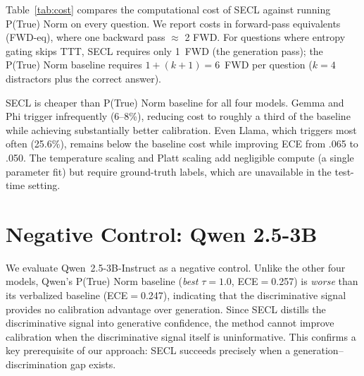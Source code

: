 Table~\ref{tab:cost} compares the computational cost of SECL against
running P(True) Norm on every question.
We report costs in forward-pass equivalents (FWD-eq), where one 
backward pass $\approx$ 2 FWD.
For questions where entropy gating skips TTT, SECL requires only 1~FWD 
(the generation pass); the P(True) Norm baseline requires $1 + (k{+}1) = 6$~FWD 
per question ($k{=}4$ distractors plus the correct answer).

\begin{table}[htbp]
\centering
\small
{}%
\caption{Computational cost comparison (in FWD-equivalents).
\emph{Trained} = questions receiving TTT;
\emph{Skipped} = entropy-gated questions (generation only).
Per trained question: ${\approx}15$ FWD-eq 
(1~gen $+$ 5~P(True) $+$ 3~epochs $\times$ 3~FWD-eq/step).
Per skipped question: $1$ FWD-eq.
P(True) Norm baseline: 6 FWD-eq $\times$ 2{,}000 $= 12{,}000$.}
\label{tab:cost}
\vspace{-0.5em}
\end{table}

SECL is cheaper than P(True) Norm baseline for all four models.
Gemma and Phi trigger infrequently (6--8\%), reducing cost to roughly
a third of the baseline while achieving substantially better calibration.
Even Llama, which triggers most often (25.6\%), remains below the
baseline cost while improving ECE from .065 to .050.
The temperature scaling and Platt scaling add negligible compute
(a single parameter fit) but require ground-truth labels, which are 
unavailable in the test-time setting.

\section{Negative Control: Qwen 2.5-3B} \label{app:qwen}

We evaluate Qwen~2.5-3B-Instruct \citep{qwen_qwen25_2025} as a negative control.
Unlike the other four models, Qwen's P(True) Norm baseline 
(\emph{best} $\tau{=}1.0$, ECE$=$0.257) is \emph{worse} than its
verbalized baseline (ECE$=$0.247), indicating that the 
discriminative signal provides no calibration advantage over generation.
Since SECL distills the discriminative signal into generative confidence,
the method cannot improve calibration when the discriminative signal 
itself is uninformative.
This confirms a key prerequisite of our approach: SECL succeeds 
precisely when a generation--discrimination gap exists.

